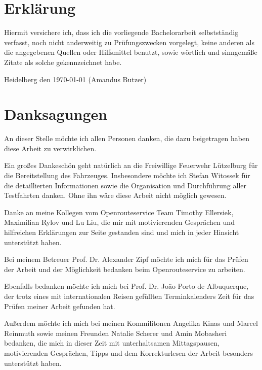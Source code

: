 \newpage
\section*{Erklärung}
\vspace{1cm}
Hiermit versichere ich, dass ich die vorliegende Bachelorarbeit selbstständig verfasst, noch nicht anderweitig zu Prüfungszwecken vorgelegt, keine anderen als die angegebenen Quellen oder Hilfsmittel benutzt, sowie wörtlich und sinngemäße Zitate als solche gekennzeichnet habe.\par
\bigskip

{\flushleft Heidelberg den \today }
{\flushright\vspace{-0.4cm}\hfill (Amandus Butzer)      }

\newpage
\section*{Danksagungen}

An dieser Stelle möchte ich allen Personen danken, die dazu beigetragen haben diese Arbeit zu verwirklichen.\par
\vspace{0.5cm}
Ein großes Dankeschön geht natürlich an die Freiwillige Feuerwehr Lützelburg für die Bereitstellung des Fahrzeuges.
Insbesondere möchte ich Stefan Witossek für die detaillierten Informationen sowie die Organisation und Durchführung aller Testfahrten danken.
Ohne ihn wäre diese Arbeit nicht möglich gewesen.\par
\vspace{0.5cm}
Danke an meine Kollegen vom Openrouteservice Team Timothy Ellersiek, Maximilian Rylov und Lu Liu, die mir mit motivierenden Gesprächen und hilfreichen Erklärungen zur Seite gestanden sind und mich in jeder Hinsicht unterstützt haben.\par
\vspace{0.5cm}
Bei meinem Betreuer Prof. Dr. Alexander Zipf möchte ich mich für das Prüfen der Arbeit und der Möglichkeit bedanken beim Openrouteservice zu arbeiten.\par
Ebenfalls bedanken möchte ich mich bei Prof. Dr. Jo\~ao Porto de Albuquerque, der trotz eines mit internationalen Reisen gefüllten Terminkalenders Zeit für das Prüfen meiner Arbeit gefunden hat.\par
\vspace{0.5cm}
Außerdem möchte ich mich bei meinen Kommilitonen Angelika Kinas und Marcel Reinmuth sowie meinen Freunden Natalie Scherer und Amin Mobasheri bedanken, die mich in dieser Zeit mit unterhaltsamen Mittagspausen, motivierenden Gesprächen, Tipps und dem Korrekturlesen der Arbeit besonders unterstützt haben.


\newpage
\vspace{1cm}
